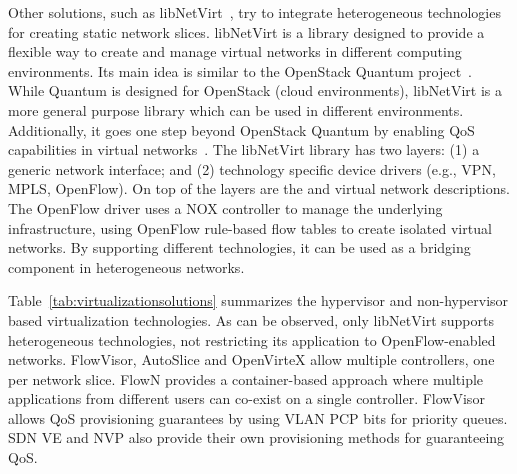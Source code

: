 Other solutions, such as libNetVirt~\cite{turull2012}, try to integrate heterogeneous technologies for creating 
static network slices. libNetVirt is a library designed to provide a flexible way to create and manage virtual 
networks in different computing environments. Its main idea is similar to the OpenStack Quantum 
project~\cite{quantumcommunicty2012}. While Quantum is designed for OpenStack (cloud environments), 
libNetVirt is a more general purpose library which can be used in different environments. Additionally, 
it goes one step beyond OpenStack Quantum by enabling QoS capabilities in virtual networks~\cite{turull2012}.
The libNetVirt library has two layers: (1) a generic network interface; and (2) technology specific device drivers 
(e.g., VPN, MPLS, OpenFlow). On top of the layers are the \manapps and virtual network descriptions.
The OpenFlow driver uses a NOX controller to manage the underlying infrastructure, using OpenFlow rule-based flow 
tables to create isolated virtual networks. By supporting different technologies, it can be used as a bridging 
component in heterogeneous networks.



Table~\ref{tab:virtualizationsolutions} summarizes the hypervisor and non-hypervisor based virtualization 
technologies. 
As can be observed, only libNetVirt supports heterogeneous technologies, not restricting its 
application to OpenFlow-enabled networks. FlowVisor, AutoSlice and OpenVirteX allow multiple controllers, 
one per network slice. FlowN provides a container-based approach where multiple applications from different 
users can co-exist on a single controller. FlowVisor allows QoS provisioning guarantees by using VLAN PCP bits for priority queues.
SDN VE and NVP also provide their own provisioning methods for guaranteeing QoS.


